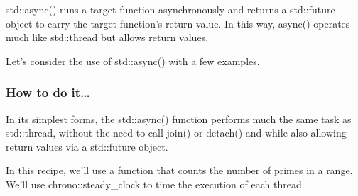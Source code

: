 
std::async() runs a target function asynchronously and returns a std::future object to carry the target function's return value. In this way, async() operates much like std::thread but allows return values.

Let's consider the use of std::async() with a few examples.

\subsubsection{How to do it…}

In its simplest forms, the std::async() function performs much the same task as std::thread, without the need to call join() or detach() and while also allowing return values via a std::future object.

In this recipe, we'll use a function that counts the number of primes in a range. We'll use chrono::steady\_clock to time the execution of each thread.

